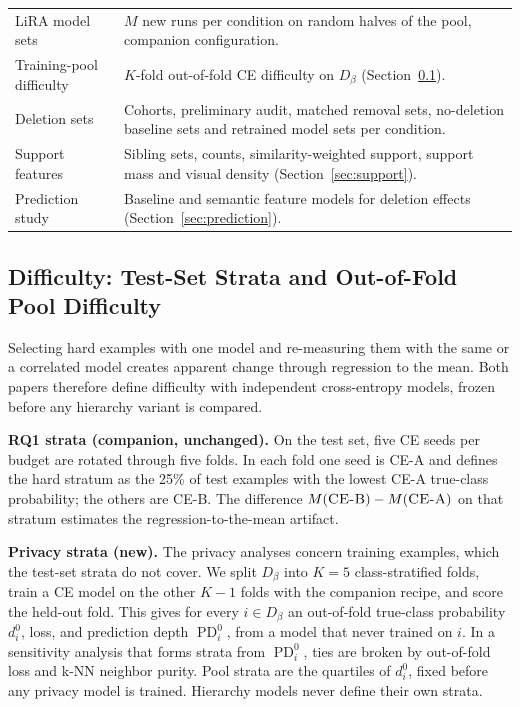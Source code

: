 \documentclass{article} %
\newcommand{\cn}[1]{\textsc{#1}}
\newcommand{\PD}{\operatorname{PD}}
\begin{document}
\begin{table}[t]
\begin{center}
\begin{tabularx}{\linewidth}{@{}>{\raggedright\arraybackslash}p{3.3cm}>{\raggedright\arraybackslash}X@{}}
LiRA model sets & $M$ new runs per condition on random halves of the pool, companion configuration. \\
Training-pool difficulty & $K$-fold out-of-fold CE difficulty on $D_\beta$ (Section~\ref{sec:difficulty}). \\
Deletion sets & Cohorts, preliminary audit, matched removal sets, no-deletion baseline sets and retrained model sets per condition. \\
Support features & Sibling sets, counts, similarity-weighted support, support mass and visual density (Section~\ref{sec:support}). \\
Prediction study & Baseline and semantic feature models for deletion effects (Section~\ref{sec:prediction}). \\
\bottomrule
\end{tabularx}
\end{center}
\end{table}

\subsection{Difficulty: Test-Set Strata and Out-of-Fold Pool Difficulty}
\label{sec:difficulty}

Selecting hard examples with one model and re-measuring them with the same or a correlated model creates apparent change through regression to the mean. Both papers therefore define difficulty with independent cross-entropy models, frozen before any hierarchy variant is compared.

\textbf{RQ1 strata (companion, unchanged).} On the test set, five \cn{CE} seeds per budget are rotated through five folds. In each fold one seed is \cn{CE-A} and defines the hard stratum as the 25\% of test examples with the lowest \cn{CE-A} true-class probability; the others are \cn{CE-B}. The difference $M(\cn{CE-B})-M(\cn{CE-A})$ on that stratum estimates the regression-to-the-mean artifact.

\textbf{Privacy strata (new).} The privacy analyses concern training examples, which the test-set strata do not cover. We split $D_\beta$ into $K=5$ class-stratified folds, train a \cn{CE} model on the other $K-1$ folds with the companion recipe, and score the held-out fold. This gives for every $i\in D_\beta$ an out-of-fold true-class probability $d_i^0$, loss, and prediction depth $\PD_i^0$, from a model that never trained on $i$. In a sensitivity analysis that forms strata from $\PD_i^0$, ties are broken by out-of-fold loss and k-NN neighbor purity. Pool strata are the quartiles of $d_i^0$, fixed before any privacy model is trained. Hierarchy models never define their own strata.
\end{document}

